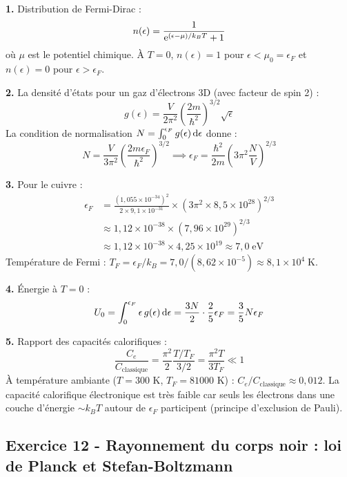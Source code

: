 \documentclass[12pt,a4paper]{article}
\begin{document}
\begin{boitecorrige}
\textbf{1.} Distribution de Fermi-Dirac :
\[
n(\epsilon) = \frac{1}{\mathrm{e}^{(\epsilon-\mu)/k_BT}+1}
\]
où $\mu$ est le potentiel chimique. À $T=0$, $n(\epsilon)=1$ pour $\epsilon<\mu_0=\epsilon_F$ et $n(\epsilon)=0$ pour $\epsilon>\epsilon_F$.

\textbf{2.} La densité d'états pour un gaz d'électrons 3D (avec facteur de spin 2) :
\[
g(\epsilon) = \frac{V}{2\pi^2}\left(\frac{2m}{\hbar^2}\right)^{3/2}\sqrt{\epsilon}
\]
La condition de normalisation $N = \int_0^{\epsilon_F} g(\epsilon)\,\mathrm{d}\epsilon$ donne :
\[
N = \frac{V}{3\pi^2}\left(\frac{2m\epsilon_F}{\hbar^2}\right)^{3/2}
\implies \epsilon_F = \frac{\hbar^2}{2m}\left(3\pi^2\frac{N}{V}\right)^{2/3}
\]

\textbf{3.} Pour le cuivre :
\begin{align*}
\epsilon_F &= \frac{(1{,}055\times10^{-34})^2}{2\times9{,}1\times10^{-31}}\times(3\pi^2\times8{,}5\times10^{28})^{2/3}\\
&\approx 1{,}12\times10^{-38}\times(7{,}96\times10^{29})^{2/3}\\
&\approx 1{,}12\times10^{-38}\times4{,}25\times10^{19}\approx 7{,}0\;\text{eV}
\end{align*}
Température de Fermi : $T_F = \epsilon_F/k_B = 7{,}0/(8{,}62\times10^{-5})\approx 8{,}1\times10^4\;\text{K}$.

\textbf{4.} Énergie à $T=0$ :
\[
U_0 = \int_0^{\epsilon_F}\epsilon\,g(\epsilon)\,\mathrm{d}\epsilon = \frac{3N}{2}\cdot\frac{2}{5}\epsilon_F = \frac{3}{5}N\epsilon_F
\]

\textbf{5.} Rapport des capacités calorifiques :
\[
\frac{C_e}{C_{\text{classique}}} = \frac{\pi^2}{2}\frac{T/T_F}{3/2} = \frac{\pi^2T}{3T_F}\ll 1
\]
À température ambiante ($T=300$ K, $T_F=81000$ K) : $C_e/C_{\text{classique}}\approx 0{,}012$. La capacité calorifique électronique est très faible car seuls les électrons dans une couche d'énergie $\sim k_BT$ autour de $\epsilon_F$ participent (principe d'exclusion de Pauli).
\end{boitecorrige}

\subsection*{Exercice 12 - Rayonnement du corps noir : loi de Planck et Stefan-Boltzmann \niveau{\difficile}}
\end{document}
